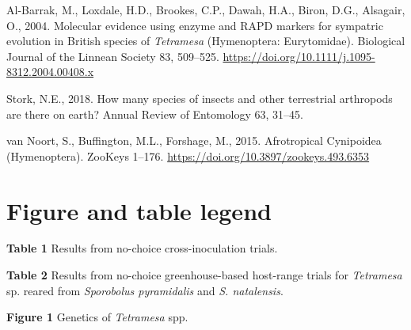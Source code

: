 \documentclass[12pt,]{article}
\begin{document}
\hypertarget{refs}{}
\begin{CSLReferences}{1}{0}
\leavevmode\hypertarget{ref-Al-Barrak2004}{}%
Al-Barrak, M., Loxdale, H.D., Brookes, C.P., Dawah, H.A., Biron, D.G.,
Alsagair, O., 2004. Molecular evidence using enzyme and {RAPD} markers
for sympatric evolution in {British} species of {\emph{Tetramesa}}
({Hymenoptera}: {Eurytomidae}). Biological Journal of the Linnean
Society 83, 509--525.
\url{https://doi.org/10.1111/j.1095-8312.2004.00408.x}

\leavevmode\hypertarget{ref-Stork2018}{}%
Stork, N.E., 2018. How many species of insects and other terrestrial
arthropods are there on earth? Annual Review of Entomology 63, 31--45.

\leavevmode\hypertarget{ref-VanNoort2015}{}%
van Noort, S., Buffington, M.L., Forshage, M., 2015. Afrotropical
{Cynipoidea} ({Hymenoptera}). ZooKeys 1--176.
\url{https://doi.org/10.3897/zookeys.493.6353}

\end{CSLReferences}

\newpage

\hypertarget{figure-and-table-legend}{%
\section{Figure and table legend}\label{figure-and-table-legend}}

\setlength{\parindent}{-0.2in}
\setlength{\leftskip}{0.2in}
\setlength{\parskip}{8pt}
\vspace*{-0.2in}

\noindent

\textbf{Table 1} Results from no-choice cross-inoculation trials.

\textbf{Table 2} Results from no-choice greenhouse-based host-range
trials for \emph{Tetramesa} sp. reared from \emph{Sporobolus
pyramidalis} and \emph{S. natalensis}.

\textbf{Figure 1} Genetics of \emph{Tetramesa} spp.

\newpage





\newpage
\singlespacing 
\end{document}
